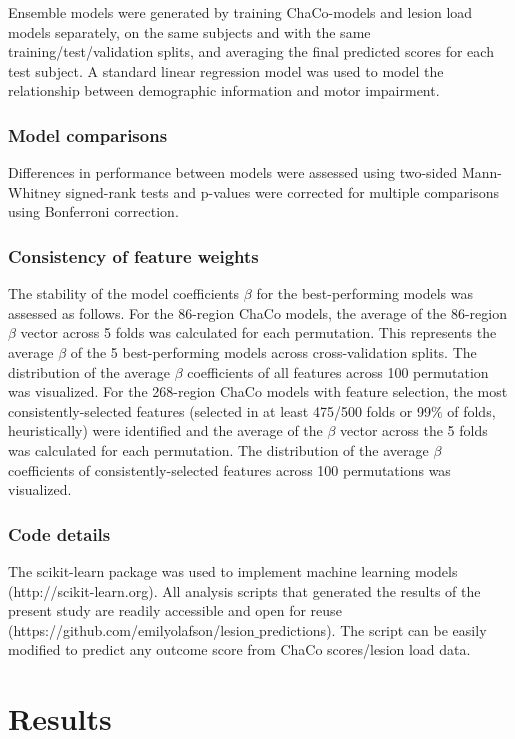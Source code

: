\documentclass[10pt]{article}
\begin{document}
Ensemble models were generated by training ChaCo-models and lesion load models separately, on the same subjects and with the same training/test/validation splits, and averaging the final predicted scores for each test subject. A standard linear regression model was used to model the relationship between demographic information and motor impairment. 

\subsubsection*{Model comparisons}
Differences in performance between models were assessed using two-sided Mann-Whitney signed-rank tests and p-values were corrected for multiple comparisons using Bonferroni correction. 

\subsubsection*{Consistency of feature weights}
The stability of the model coefficients $\beta$ for the best-performing models was assessed as follows. For the 86-region ChaCo models, the average of the 86-region $\beta$ vector across 5 folds was calculated for each permutation. This represents the average $\beta$ of the 5 best-performing models across cross-validation splits. The distribution of the average $\beta$ coefficients of all features across 100 permutation was visualized. For the 268-region ChaCo models with feature selection, the most consistently-selected features (selected in at least 475/500 folds or 99$\%$ of folds, heuristically) were identified and the average of the $\beta$ vector across the 5 folds was calculated for each permutation. The distribution of the average $\beta$ coefficients of consistently-selected features across 100 permutations was visualized. 

\subsubsection*{Code details}
The scikit-learn package was used to implement machine learning models (http://scikit-learn.org). All analysis scripts that generated the results of the present study are readily accessible and open for reuse (https://github.com/emilyolafson/lesion$\_$predictions). The script can be easily modified to predict any outcome score from ChaCo scores/lesion load data.

\section{Results}
\end{document}
